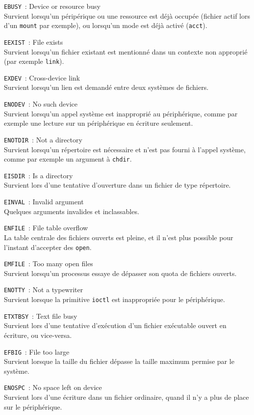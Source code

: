 \documentclass [twoside] {report}
\begin{document}
{\tt EBUSY}~: Device or resource busy \\
Survient lorsqu'un péripérique ou une ressource
est déjà occupée (fichier actif lors d'un
{\tt mount} par exemple), ou lorsqu'un mode est déjà
activé ({\tt acct}).

{\tt EEXIST}~: File exists \\
Survient lorsqu'un fichier existant est mentionné
dans un contexte non approprié (par exemple
{\tt link}).

{\tt EXDEV}~: Cross-device link \\
Survient lorsqu'un lien est demandé entre deux
systèmes de fichiers.

{\tt ENODEV}~: No such device \\
Survient lorsqu'un appel système est inapproprié
au périphérique, comme par exemple une lecture sur
un périphérique en écriture seulement.

{\tt ENOTDIR}~: Not a directory \\
Survient lorsqu'un répertoire est nécessaire et
n'est pas fourni à l'appel système, comme par
exemple un argument à {\tt chdir}.

{\tt EISDIR}~: Is a directory \\
Survient lors d'une tentative d'ouverture dans un
fichier de type répertoire.

{\tt EINVAL}~: Invalid argument \\
Quelques arguments invalides et inclassables.

{\tt ENFILE}~: File table overflow \\
La table centrale des fichiers ouverts est
pleine, et il n'est plus possible pour l'instant
d'accepter des {\tt open}.

{\tt EMFILE}~: Too many open files \\
Survient lorsqu'un processus essaye de dépasser
son quota de fichiers ouverts.

{\tt ENOTTY}~: Not a typewriter \\
Survient lorsque la primitive {\tt ioctl} est
inappropriée pour le périphérique.

{\tt ETXTBSY}~: Text file busy \\
Survient lors d'une tentative d'exécution d'un
fichier exécutable ouvert en écriture, ou
vice-versa.

{\tt EFBIG}~: File too large \\
Survient lorsque la taille du fichier dépasse la
taille maximum permise par le système.

{\tt ENOSPC}~: No space left on device \\
Survient lors d'une écriture dans un fichier
ordinaire, quand il n'y a plus de place sur le
périphérique.
\end{document}
